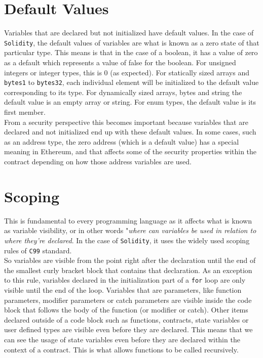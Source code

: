 \section{Default Values}
Variables that are declared but not initialized have default values. In the case of \texttt{Solidity}, the default values of variables are what is known as a zero state of that particular type. This means is that in the case of a boolean, it has a value of zero as a default which represents a value of false for the boolean. For unsigned integers or integer types, this is 0 (as expected). For statically sized arrays and \texttt{bytes1} to \texttt{bytes32}, each individual element will be initialized to the default value corresponding to its type. For dynamically sized arrays, bytes and string the default value is an empty array or string. For enum types, the default value is its first member.\\

From a security perspective this becomes important because variables that are declared and not initialized end up with these default values. In some cases, such as an address type, the zero address (which is a default value) has a special meaning in Ethereum, and that affects some of the security properties within the contract depending on how those address variables are used.

\section{Scoping}
This is fundamental to every programming language as it affects what is known as variable visibility, or in other words "\textit{where can variables be used in relation to where they're declared}. In the case of \texttt{Solidity}, it uses the widely used scoping rules of \texttt{C99} standard.\\

So variables are visible from the point right after the declaration until the end of the smallest curly bracket block that contains that declaration. As an exception to this rule, variables declared in the initialization part of a \texttt{for} loop are only visible until the end of the loop. Variables that are parameters, like function parameters, modifier parameters or catch parameters are visible inside the code block that follows the body of the function (or modifier or catch). Other items declared outside of a code block such as functions, contracts, state variables or user defined types are visible even before they are declared. This means that we can see the usage of state variables even before they are declared within the context of a contract. This is what allows functions to be called recursively.\\

